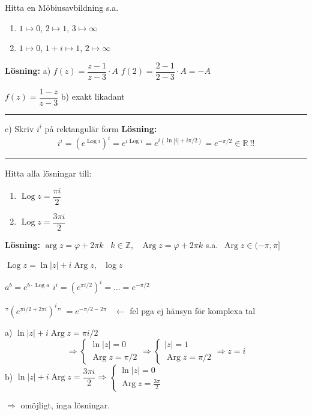  \quad Hitta en Möbiusavbildning s.a.
\begin{enumerate}[label=\alph*)]
  \item $1 \mapsto 0$, $2 \mapsto 1$, $3 \mapsto \infty$
  \item $1 \mapsto 0$, $1 + i \mapsto 1$, $2 \mapsto \infty$
\end{enumerate}
\textbf{Lösning:} a) $f(z) = \dfrac{z - 1}{z - 3} \cdot A$ \qquad $f(2) = \dfrac{2 - 1}{2 - 3} \cdot A = -A$

\qquad $f(z) = \dfrac{1 - z}{z - 3}$ \qquad b) exakt likadant

\noindent\rule{\linewidth}{0.4pt}

 \quad c) Skriv $i^i$ på rektangulär form
\textbf{Lösning:}
\[ i^i = (e^{\operatorname{Log} i})^i = e^{i\operatorname{Log} i} = e^{i(\ln|i| + i\pi/2)} = e^{-\pi/2} \in \mathbb{R} \ !! \]

\noindent\rule{\linewidth}{0.4pt}

 \quad Hitta alla lösningar till:
\begin{enumerate}[label=\alph*)]
  \item $\operatorname{Log} z = \dfrac{\pi i}{2}$
  \item $\operatorname{Log} z = \dfrac{3\pi i}{2}$
\end{enumerate}
\textbf{Lösning:} $\arg z = \varphi + 2\pi k$ \ $k \in \mathbb{Z}$, \ $\operatorname{Arg} z = \varphi + 2\pi k$ s.a.\ $\operatorname{Arg} z \in (-\pi, \pi]$

\begin{definition}
$\operatorname{Log} z = \ln|z| + i\operatorname{Arg} z$, \ $\log z$
\end{definition}
\begin{definition}
$a^b = e^{b \cdot \operatorname{Log} a}$ \qquad $i^i = (e^{\pi i/2})^i = \dots = e^{-\pi/2}$

''$(e^{\pi i/2 + 2\pi i})^i$'' $= e^{-\pi/2 - 2\pi}$ \ \textcolor{magenta!80!black}{$\leftarrow$ fel pga ej hänsyn för komplexa tal}
\end{definition}

a) $\ln|z| + i\operatorname{Arg} z = \pi i/2$
\[ \Rightarrow \begin{cases} \ln|z| = 0 \\ \operatorname{Arg} z = \pi/2 \end{cases} \Rightarrow \begin{cases} |z| = 1 \\ \operatorname{Arg} z = \pi/2 \end{cases} \Rightarrow z = i \]
b) $\ln|z| + i\operatorname{Arg} z = \dfrac{3\pi i}{2} \Rightarrow \begin{cases} \ln|z| = 0 \\ \operatorname{Arg} z = \frac{3\pi}{2} \end{cases}$

$\Rightarrow$ omöjligt, inga lösningar.
